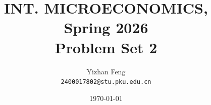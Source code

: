 \title{\textbf{INT. MICROECONOMICS, Spring 2026} \\[0.5em]
    \Large Problem Set 2}
\author{Yizhan Feng \\ 
    \normalsize{\texttt{2400017802@stu.pku.edu.cn}}}
\date{\today}